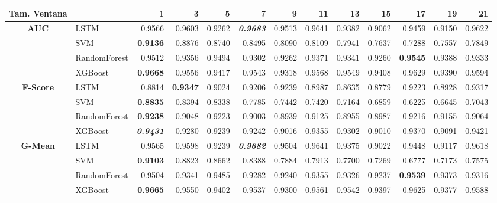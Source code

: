 \begin{table}[H]
	\centering
	\begin{adjustbox}{max width=12cm}
		\begin{tabular}{|c|l|r|r|r|r|r|r|r|r|r|r|r|}
			\hline
			\textbf{Tam. Ventana}&         &      1  &      3  &      5  &      7  &      9  &      11 &      13 &      15 &      17 &      19 &      21 \\
			\hline
			\textbf{AUC} &  LSTM &  0.9566 &  0.9603 &  0.9262 & \textit{ \textbf{  0.9683 } } &  0.9513 &  0.9641 &  0.9382 &  0.9062 &  0.9459 &  0.9150 &  0.9622 \\
			&  SVM & \textbf{  0.9136 } &  0.8876 &  0.8740 &  0.8495 &  0.8090 &  0.8109 &  0.7941 &  0.7637 &  0.7288 &  0.7557 &  0.7849 \\
			&  RandomForest &  0.9512 &  0.9356 &  0.9494 &  0.9302 &  0.9262 &  0.9371 &  0.9341 &  0.9260 & \textbf{  0.9545 } &  0.9388 &  0.9333 \\
			&  XGBoost & \textbf{  0.9668 } &  0.9556 &  0.9417 &  0.9543 &  0.9318 &  0.9568 &  0.9549 &  0.9408 &  0.9629 &  0.9390 &  0.9594 \\			
			\hline
			\textbf{F-Score} &  LSTM &  0.8814 & \textbf{  0.9347 } &  0.9024 &  0.9206 &  0.9239 &  0.8987 &  0.8635 &  0.8779 &  0.9223 &  0.8928 &  0.9317 \\
			&  SVM & \textbf{  0.8835 } &  0.8394 &  0.8338 &  0.7785 &  0.7442 &  0.7420 &  0.7164 &  0.6859 &  0.6225 &  0.6645 &  0.7043 \\
			&  RandomForest & \textbf{  0.9238 } &  0.9048 &  0.9223 &  0.9003 &  0.8939 &  0.9125 &  0.8955 &  0.8987 &  0.9216 &  0.9155 &  0.9064 \\
			&  XGBoost & \textit{ \textbf{  0.9431 } } &  0.9280 &  0.9239 &  0.9242 &  0.9016 &  0.9355 &  0.9302 &  0.9010 &  0.9370 &  0.9091 &  0.9421 \\
			\hline
			\textbf{G-Mean} &  LSTM &  0.9565 &  0.9598 &  0.9239 & \textit{ \textbf{  0.9682 } } &  0.9504 &  0.9641 &  0.9375 &  0.9022 &  0.9448 &  0.9117 &  0.9618 \\
			&  SVM & \textbf{  0.9103 } &  0.8823 &  0.8662 &  0.8388 &  0.7884 &  0.7913 &  0.7700 &  0.7269 &  0.6777 &  0.7173 &  0.7575 \\
			&  RandomForest &  0.9504 &  0.9341 &  0.9485 &  0.9282 &  0.9240 &  0.9355 &  0.9326 &  0.9237 & \textbf{  0.9539 } &  0.9373 &  0.9316 \\
			&  XGBoost & \textbf{  0.9665 } &  0.9550 &  0.9402 &  0.9537 &  0.9300 &  0.9561 &  0.9542 &  0.9397 &  0.9625 &  0.9377 &  0.9588 \\

\end{tabular}
\end{adjustbox}
\end{table}
